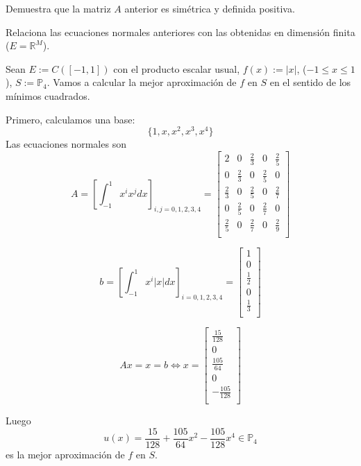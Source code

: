 \begin{ejer}
Demuestra que la matriz $A$ anterior es simétrica y definida positiva.
\end{ejer}

\begin{ejer}
Relaciona las ecuaciones normales anteriores con las obtenidas en dimensión finita ($E = \mathbb{R}^M$).
\end{ejer}

\begin{ejemplo}
Sean $E := C([-1,1])$ con el producto escalar usual, $f(x):= \vert x \vert$, ($-1 \leq x \leq 1$), $S:= \mathbb{P}_4$. Vamos a calcular la mejor aproximación de $f$ en $S$ en el sentido de los mínimos cuadrados.

Primero, calculamos una base:
\[ \lbrace 1,x,x^2,x^3,x^4 \rbrace \]
Las ecuaciones normales son
\[ A = \left[ \int_{-1}^1 x^ix^j dx \right] _{i,j=0,1,2,3,4} = \begin{bmatrix}
2 & 0 & \frac{2}{3} & 0 & \frac{2}{5} \\
0 & \frac{2}{3} & 0 & \frac{2}{5} & 0 \\
\frac{2}{3} & 0 & \frac{2}{5} & 0 & \frac{2}{7} \\
0 & \frac{2}{5} & 0 & \frac{2}{7} & 0 \\
\frac{2}{5} & 0 & \frac{2}{7} & 0 & \frac{2}{9} \\
\end{bmatrix} \]

\[ b = \left[ \int_{-1}^1 x^i \vert x \vert dx \right] _{i=0,1,2,3,4} = \begin{bmatrix}
1 \\
0 \\
\frac{1}{2} \\
0 \\
\frac{1}{3} \\
\end{bmatrix} \]

\[ Ax = x = b \Leftrightarrow x = \begin{bmatrix}
\frac{15}{128} \\
0 \\
\frac{105}{64} \\
0 \\
-\frac{105}{128} \\
\end{bmatrix} \]

Luego 
\[ u(x) = \frac{15}{128} + \frac{105}{64}x^2 - \frac{105}{128}x^4 \in \mathbb{P}_4 \]
es la mejor aproximación de $f$ en $S$.
\end{ejemplo}

